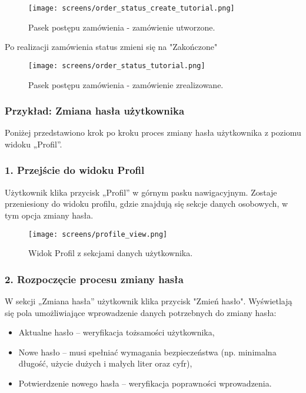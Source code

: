 \documentclass[12pt,a4paper,oneside]{article}
\theoremstyle{definition}
\numberwithin{equation}{section}
\begin{document}
\begin{figure}[H]
    \centering
    \texttt{[image: screens/order\_status\_create\_tutorial.png]}
    \caption{Pasek postępu zamówienia - zamówienie utworzone.}
    \label{fig:order_status_create_tutorial}
\end{figure}
\newpage
Po realizacji zamówienia status zmieni się na "Zakończone"

\begin{figure}[H]
    \centering
    \texttt{[image: screens/order\_status\_tutorial.png]}
    \caption{Pasek postępu zamówienia - zamówienie zrealizowane.}
    \label{fig:order_status_tutorial}
\end{figure}


\subsubsection{Przykład: Zmiana hasła użytkownika}
Poniżej przedstawiono krok po kroku proces zmiany hasła użytkownika z poziomu widoku „Profil”.

\subsubsection*{\textbf{1. Przejście do widoku Profil}}
Użytkownik klika przycisk „Profil” w górnym pasku nawigacyjnym. Zostaje przeniesiony do widoku profilu, gdzie znajdują się sekcje danych osobowych, w tym opcja zmiany hasła.

\begin{figure}[H]
    \centering
    \texttt{[image: screens/profile\_view.png]}
    \caption{Widok Profil z sekcjami danych użytkownika.}
    \label{fig:profile_view_tutorial}
\end{figure}

\subsubsection*{\textbf{2. Rozpoczęcie procesu zmiany hasła}}
W sekcji „Zmiana hasła” użytkownik klika przycisk "Zmień hasło". Wyświetlają się pola umożliwiające wprowadzenie danych potrzebnych do zmiany hasła:
\begin{itemize}
    \item Aktualne hasło – weryfikacja tożsamości użytkownika,
    \item Nowe hasło – musi spełniać wymagania bezpieczeństwa (np. minimalna długość, użycie dużych i małych liter oraz cyfr),
    \item Potwierdzenie nowego hasła – weryfikacja poprawności wprowadzenia.
\end{itemize}
\end{document}
